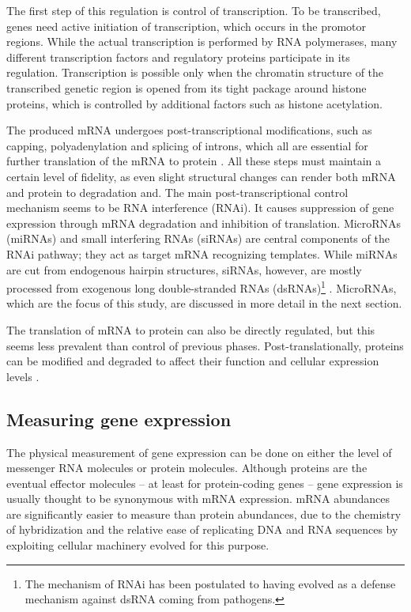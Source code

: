 The first step of this regulation is control of transcription. To be
transcribed, genes need active initiation of transcription, which
occurs in the promotor regions. While the actual transcription is performed by
RNA polymerases, many different transcription factors and regulatory proteins
participate in its regulation. Transcription is possible only when
the chromatin structure of the transcribed genetic region is opened from its
tight package around histone proteins, which is controlled by additional
factors such as histone acetylation.

The produced mRNA undergoes post-transcriptional modifications, such as
capping, polyadenylation and splicing of introns, which all are essential for
further translation of the mRNA to protein \citep{Strachan2011}. All these
steps must maintain a certain level of fidelity, as even slight structural
changes can render both mRNA and protein to degradation and. The main
post-transcriptional control mechanism seems to be RNA interference (RNAi). It
causes suppression of gene expression through mRNA degradation and inhibition of translation.
MicroRNAs (miRNAs) and small interfering RNAs (siRNAs) are central components of the
RNAi pathway; they act as target mRNA recognizing templates.
While miRNAs are cut from endogenous hairpin structures, siRNAs, however,
are mostly processed from exogenous long double-stranded RNAs
(dsRNAs)\footnote{The mechanism of RNAi has been postulated to having evolved
as a defense mechanism against dsRNA coming from pathogens.} \cite{Du2005}. MicroRNAs,
which are the focus of this study, are discussed in more detail in the next section.

The translation of mRNA to protein can also be directly regulated, but this
seems less prevalent than control of previous phases. Post-translationally,
proteins can be modified and degraded to affect their function and cellular
expression levels \citep{Strachan2011}.




\subsection{Measuring gene expression}\label{measurement-of-gene-expression}

The physical measurement of gene expression can be done on either the level of
messenger RNA molecules or protein molecules. Although proteins are the
eventual effector molecules -- at least for protein-coding genes
-- gene expression is usually thought to be synonymous with mRNA expression.
mRNA abundances are significantly easier to measure
than protein abundances, due to the chemistry of hybridization and
the relative ease of replicating DNA and RNA sequences by exploiting cellular
machinery evolved for this purpose.

